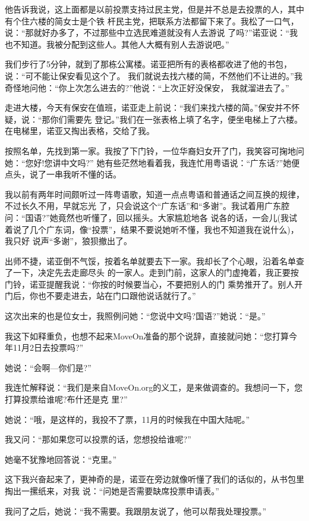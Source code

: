 ﻿\documentclass[11pt]{article}
\begin{document}
他告诉我说，这上面都是以前投票支持过民主党，但是并不总是去投票的人，其中有个住六楼的简女士是个铁
杆民主党，把联系方法都留下来了。我松了一口气，说：``那就好办多了，不过那些中立选民难道就没有人去游说
了吗?''诺亚说：``我也不知道。我被分配到这些人。其他人大概有别人去游说吧。''

我们步行了5分钟，就到了那栋公寓楼。诺亚把所有的表格都收进了他的书包，说：``可不能让保安看见这个了。
我们就说去找六楼的简，不然他们不让进的。''我奇怪地问他：``你上次怎么进去的?''他说：``上次正好没保安，
我就溜进去了。''

走进大楼，今天有保安在值班，诺亚走上前说：``我们来找六楼的简。''保安并不怀疑，说：``那你们需要先
登记。''我们在一张表格上填了名字，便坐电梯上了六楼。在电梯里，诺亚又掏出表格，交给了我。


按照名单，先找到第一家。我按了下门铃，一位华裔妇女开了门，我笑容可掬地问她：``您好!您讲中文吗?''
她有些茫然地看着我，我连忙用粤语说：``广东话?''她便点头，说了一串我听不懂的话。

我以前有两年时间颇听过一阵粤语歌，知道一点点粤语和普通话之间互换的规律，不过长久不用，早就忘光
了，只会说这个``广东话''和``多谢''。我试着用广东腔问：``国语?''她竟然也听懂了，回以摇头。大家尴尬地各
说各的话，一会儿(我试着说了几个广东词，像``投票''，结果不要说她听不懂，我也不知道我在说什么)，我只好
说声``多谢''，狼狈撤出了。

出师不捷，诺亚倒不气馁，按着名单就要去下一家。我却长了个心眼，沿着名单查了一下，决定先去走廊尽头
的一家人。走到门前，这家人的门虚掩着，我正要按门铃，诺亚提醒我说：``你按的时候要当心，不要把别人的门
乘势推开了。别人开门后，你也不要走进去，站在门口跟他说话就行了。''

这次出来的也是位女士，我照例问她：``您说中文吗?国语?''她说：``是。''

我这下如释重负，也想不起来MoveOn准备的那个说辞，直接就问她：``您打算今年11月2日去投票吗?''

她说：``会啊---你们是?''

我连忙解释说：``我们是来自MoveOn.org的义工，是来做调查的。我想问一下，您打算投票给谁呢?布什还是克
里?''

她说：``哦，是这样的，我投不了票，11月的时候我在中国大陆呢。''

我又问：``那如果您可以投票的话，您想投给谁呢?''

她毫不犹豫地回答说：``克里。''

这下我兴奋起来了，更神奇的是，诺亚在旁边就像听懂了我们的话似的，从书包里掏出一摞纸来，对我
说：``问她是否需要缺席投票申请表。''

我问了之后，她说：``我不需要。我跟朋友说了，他可以帮我处理投票。''
\end{document}

